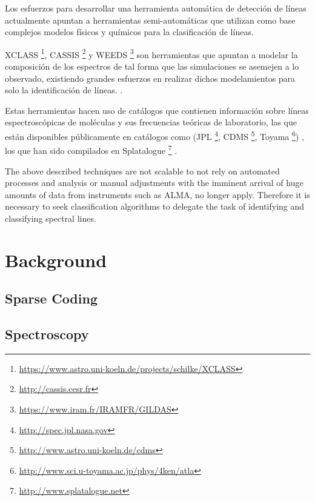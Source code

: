 \documentclass[twocolumn, draft]{emulateapj}
\begin{document}
Los esfuerzos para desarrollar una herramienta automática de detección de líneas actualmente apuntan a herramientas semi-automáticas que utilizan como base complejos modelos físicos y químicos para la clasificación de líneas. 

XCLASS \footnote{\url{https://www.astro.uni-koeln.de/projects/schilke/XCLASS}}, 
CASSIS \footnote{\url{http://cassis.cesr.fr}} y 
WEEDS \footnote{\url{https://www.iram.fr/IRAMFR/GILDAS}} 
son herramientas que apuntan a modelar la composición de los espectros de tal forma que las simulaciones se asemejen a lo observado, existiendo grandes esfuerzos en realizar dichos modelamientos para solo la identificación de líneas. \citep{Schilke2011}.

Estas herramientas hacen uso de catálogos que contienen información sobre líneas espectroscópicas de moléculas y sus frecuencias teóricas de laboratorio, las que están disponibles públicamente en catálogos como (JPL \footnote{\url{http://spec.jpl.nasa.gov}}, 
CDMS \footnote{\url{http://www.astro.uni-koeln.de/cdms}}, 
Toyama \footnote{\url{http://www.sci.u-toyama.ac.jp/phys/4ken/atla}}) 
\citep{Schilke2011}, los que han sido compilados en 
Splatalogue \footnote{\url{http://www.splatalogue.net}} 
\citep{Remijan2008, Remijan2010}.

The above described techniques are not scalable to not rely on automated processes and analysis or manual adjustments with the imminent arrival of huge amounts of data from instruments such as ALMA, no longer apply. Therefore it is necessary to seek classification algorithms to delegate the task of identifying and classifying spectral lines.


\section{Background}
\label{sec:background}
\subsection{Sparse Coding}
\subsection{Spectroscopy}
\end{document}

